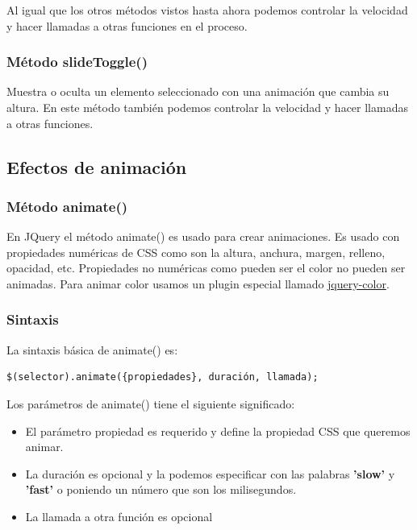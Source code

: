 \documentclass[a4paper, oneside]{article}
\begin{document}
Al igual que los otros métodos vistos hasta ahora podemos controlar la velocidad y hacer llamadas a otras funciones en el proceso.

\subsubsection{Método slideToggle()}
\label{sec:org58127cb}

Muestra o oculta un elemento seleccionado con una animación que cambia su altura. En este método también podemos  controlar la velocidad y hacer llamadas a otras funciones.

\subsection{Efectos de animación}
\label{sec:org0bb607b}

\subsubsection{Método animate()}
\label{sec:orgc775be2}

En JQuery el método animate() es usado para crear animaciones. Es usado con propiedades numéricas de CSS como son la altura, anchura, margen, relleno, opacidad, etc. Propiedades no numéricas como pueden ser el color no pueden ser animadas. Para animar color usamos un plugin especial llamado \href{https://github.com/jquery/jquery-color}{jquery-color}.

\subsubsection{Sintaxis}
\label{sec:orgdf3e5bf}

La sintaxis básica de animate() es:

\begin{verbatim}
$(selector).animate({propiedades}, duración, llamada);
\end{verbatim}

Los parámetros de animate() tiene el siguiente significado:

\begin{itemize}
\item El parámetro propiedad es requerido y define la propiedad CSS que queremos animar.
\item La duración es opcional y la podemos especificar con las palabras \textbf{'slow'} y \textbf{'fast'} o poniendo un número que son los milisegundos.
\item La llamada a otra función es opcional
\end{itemize}
\end{document}
